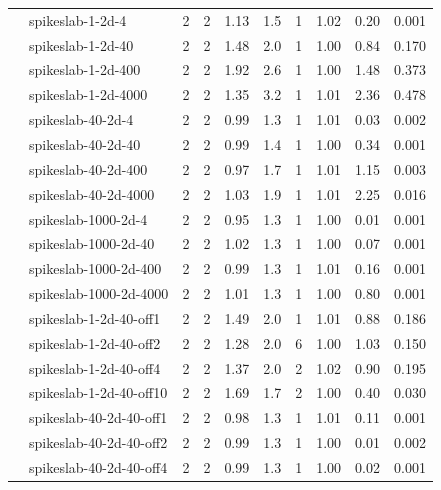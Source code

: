 \begin{tabular}{ll|rrcccccc}
                     & spikeslab-1-2d-4     & 2   & 2    & 1.13 & 1.5 &    1 & 1.02 & 0.20 & 0.001 \\
                     & spikeslab-1-2d-40    & 2   & 2    & 1.48 & 2.0 &    1 & 1.00 & 0.84 & 0.170 \\
                     & spikeslab-1-2d-400   & 2   & 2    & 1.92 & 2.6 &    1 & 1.00 & 1.48 & 0.373 \\
                     & spikeslab-1-2d-4000  & 2   & 2    & 1.35 & 3.2 &    1 & 1.01 & 2.36 & 0.478 \\
                     & spikeslab-40-2d-4    & 2   & 2    & 0.99 & 1.3 &    1 & 1.01 & 0.03 & 0.002 \\
                     & spikeslab-40-2d-40   & 2   & 2    & 0.99 & 1.4 &    1 & 1.00 & 0.34 & 0.001 \\
                     & spikeslab-40-2d-400  & 2   & 2    & 0.97 & 1.7 &    1 & 1.01 & 1.15 & 0.003 \\
                     & spikeslab-40-2d-4000 & 2   & 2    & 1.03 & 1.9 &    1 & 1.01 & 2.25 & 0.016 \\
                     & spikeslab-1000-2d-4  & 2   & 2    & 0.95 & 1.3 &    1 & 1.00 & 0.01 & 0.001 \\
                     & spikeslab-1000-2d-40 & 2   & 2    & 1.02 & 1.3 &    1 & 1.00 & 0.07 & 0.001 \\
                     & spikeslab-1000-2d-400 & 2   & 2    & 0.99 & 1.3 &    1 & 1.01 & 0.16 & 0.001 \\
                     & spikeslab-1000-2d-4000 & 2   & 2    & 1.01 & 1.3 &    1 & 1.00 & 0.80 & 0.001 \\
                     & spikeslab-1-2d-40-off1 & 2   & 2    & 1.49 & 2.0 &    1 & 1.01 & 0.88 & 0.186 \\
                     & spikeslab-1-2d-40-off2 & 2   & 2    & 1.28 & 2.0 &    6 & 1.00 & 1.03 & 0.150 \\
                     & spikeslab-1-2d-40-off4 & 2   & 2    & 1.37 & 2.0 &    2 & 1.02 & 0.90 & 0.195 \\
                     & spikeslab-1-2d-40-off10 & 2   & 2    & 1.69 & 1.7 &    2 & 1.00 & 0.40 & 0.030 \\
                     & spikeslab-40-2d-40-off1 & 2   & 2    & 0.98 & 1.3 &    1 & 1.01 & 0.11 & 0.001 \\
                     & spikeslab-40-2d-40-off2 & 2   & 2    & 0.99 & 1.3 &    1 & 1.00 & 0.01 & 0.002 \\
                     & spikeslab-40-2d-40-off4 & 2   & 2    & 0.99 & 1.3 &    1 & 1.00 & 0.02 & 0.001 \\

\end{tabular}
